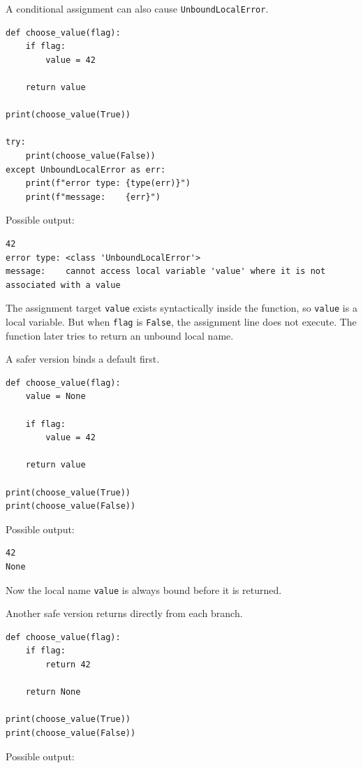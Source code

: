 A conditional assignment can also cause \texttt{UnboundLocalError}.

\begin{verbatim}
def choose_value(flag):
    if flag:
        value = 42

    return value

print(choose_value(True))

try:
    print(choose_value(False))
except UnboundLocalError as err:
    print(f"error type: {type(err)}")
    print(f"message:    {err}")
\end{verbatim}

Possible output:

\begin{verbatim}
42
error type: <class 'UnboundLocalError'>
message:    cannot access local variable 'value' where it is not associated with a value
\end{verbatim}

The assignment target \texttt{value} exists syntactically inside the function, so \texttt{value} is a local variable. But when \texttt{flag} is \texttt{False}, the assignment line does not execute. The function later tries to return an unbound local name.

A safer version binds a default first.

\begin{verbatim}
def choose_value(flag):
    value = None

    if flag:
        value = 42

    return value

print(choose_value(True))
print(choose_value(False))
\end{verbatim}

Possible output:

\begin{verbatim}
42
None
\end{verbatim}

Now the local name \texttt{value} is always bound before it is returned.

Another safe version returns directly from each branch.

\begin{verbatim}
def choose_value(flag):
    if flag:
        return 42

    return None

print(choose_value(True))
print(choose_value(False))
\end{verbatim}

Possible output:

